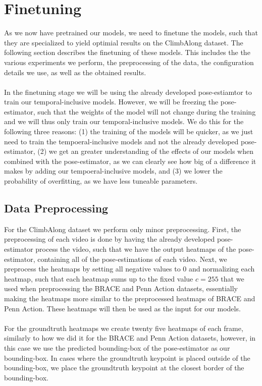 \documentclass[./main.tex]{subfiles}
\begin{document}
\section{Finetuning}
\label{sec:finetuning}
As we now have pretrained our models, we need to finetune the models, such that they are specialized to yield optimial results on the ClimbAlong dataset. The following section describes the finetuning of these models. This includes the the various experiments we perform, the preprocessing of the data, the configuration details we use, as well as the obtained results.
\\
\\
In the finetuning stage we will be using the already developed pose-estiamtor to train our temporal-inclusive models. However, we will be freezing the pose-estimator, such that the weights of the model will not change during the training and we will thus only train our temporal-inclusive models. We do this for the following three reasons: (1) the training of the models will be quicker, as we just need to train the tempoeral-inclusive models and not the already developed pose-estimator, (2) we get an greater understanding of the effects of our models when combined with the pose-estimator, as we can clearly see how big of a difference it makes by adding our tempoeral-inclusive models, and (3) we lower the probability of overfitting, as we have less tuneable parameters.

\subsection{Data Preprocessing}
For the ClimbAlong dataset we perform only minor preprocessing. First, the preprocessing of each video is done by having the already developed pose-estimator process the video, such that we have the output heatmaps of the pose-estimator, containing all of the pose-estimations of each video. Next, we preprocess the heatmaps by setting all negative values to $0$ and normalizing each heatmap, such that each heatmap sums up to the fixed value $c = 255$ that we used when preprocessing the BRACE and Penn Action datasets, essentially making the heatmaps more similar to the preprocessed heatmaps of BRACE and Penn Action. These heatmaps will then be used as the input for our models.
\\
\\
For the groundtruth heatmaps we create twenty five heatmaps of each frame, similarly to how we did it for the BRACE and Penn Action datasets, however, in this case we use the predicted bounding-box of the pose-estimator as our bounding-box. In cases where the groundtruth keypoint is placed outside of the bounding-box, we place the groundtruth keypoint at the closest border of the bounding-box.
\end{document}

